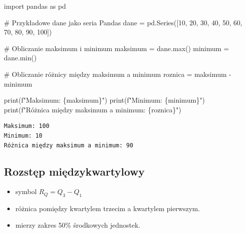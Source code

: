 \documentclass[
  polish,
  letterpaper,
  DIV=11,
  numbers=noendperiod]{scrreprt}
\newenvironment{Shaded}{\begin{snugshade}}{\end{snugshade}}
\newcommand{\BuiltInTok}[1]{\textcolor[rgb]{0.00,0.23,0.31}{#1}}
\newcommand{\CommentTok}[1]{\textcolor[rgb]{0.37,0.37,0.37}{#1}}
\newcommand{\DecValTok}[1]{\textcolor[rgb]{0.68,0.00,0.00}{#1}}
\newcommand{\ImportTok}[1]{\textcolor[rgb]{0.00,0.46,0.62}{#1}}
\newcommand{\NormalTok}[1]{\textcolor[rgb]{0.00,0.23,0.31}{#1}}
\newcommand{\OperatorTok}[1]{\textcolor[rgb]{0.37,0.37,0.37}{#1}}
\newcommand{\SpecialCharTok}[1]{\textcolor[rgb]{0.37,0.37,0.37}{#1}}
\newcommand{\SpecialStringTok}[1]{\textcolor[rgb]{0.13,0.47,0.30}{#1}}
\providecommand{\tightlist}{%
  \setlength{\itemsep}{0pt}\setlength{\parskip}{0pt}}
\begin{document}
\begin{Shaded}
\begin{Highlighting}[]
\ImportTok{import}\NormalTok{ pandas }\ImportTok{as}\NormalTok{ pd}

\CommentTok{\# Przykładowe dane jako seria Pandas}
\NormalTok{dane }\OperatorTok{=}\NormalTok{ pd.Series([}\DecValTok{10}\NormalTok{, }\DecValTok{20}\NormalTok{, }\DecValTok{30}\NormalTok{, }\DecValTok{40}\NormalTok{, }\DecValTok{50}\NormalTok{, }\DecValTok{60}\NormalTok{, }\DecValTok{70}\NormalTok{, }\DecValTok{80}\NormalTok{, }\DecValTok{90}\NormalTok{, }\DecValTok{100}\NormalTok{])}

\CommentTok{\# Obliczanie maksimum i minimum}
\NormalTok{maksimum }\OperatorTok{=}\NormalTok{ dane.}\BuiltInTok{max}\NormalTok{()}
\NormalTok{minimum }\OperatorTok{=}\NormalTok{ dane.}\BuiltInTok{min}\NormalTok{()}

\CommentTok{\# Obliczanie różnicy między maksimum a minimum}
\NormalTok{roznica }\OperatorTok{=}\NormalTok{ maksimum }\OperatorTok{{-}}\NormalTok{ minimum}

\BuiltInTok{print}\NormalTok{(}\SpecialStringTok{f"Maksimum: }\SpecialCharTok{\{}\NormalTok{maksimum}\SpecialCharTok{\}}\SpecialStringTok{"}\NormalTok{)}
\BuiltInTok{print}\NormalTok{(}\SpecialStringTok{f"Minimum: }\SpecialCharTok{\{}\NormalTok{minimum}\SpecialCharTok{\}}\SpecialStringTok{"}\NormalTok{)}
\BuiltInTok{print}\NormalTok{(}\SpecialStringTok{f"Różnica między maksimum a minimum: }\SpecialCharTok{\{}\NormalTok{roznica}\SpecialCharTok{\}}\SpecialStringTok{"}\NormalTok{)}
\end{Highlighting}
\end{Shaded}

\begin{verbatim}
Maksimum: 100
Minimum: 10
Różnica między maksimum a minimum: 90
\end{verbatim}

\subsection{Rozstęp
międzykwartylowy}\label{rozstux119p-miux119dzykwartylowy}

\begin{itemize}
\tightlist
\item
  symbol \(R_Q=Q_3-Q_1\)
\item
  różnica pomiędzy kwartylem trzecim a kwartylem pierwszym.
\item
  mierzy zakres 50\% środkowych jednostek.
\end{itemize}
\end{document}
